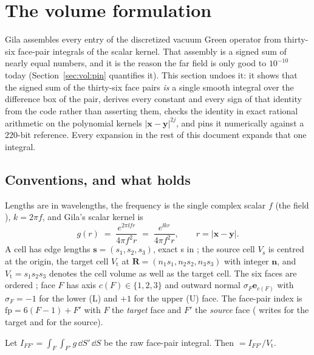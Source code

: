 \section{The volume formulation}
\label{sec:vol}

Gila assembles every entry of the discretized vacuum Green operator from thirty-six
face-pair integrals of the scalar kernel. That assembly is a signed sum of nearly equal
numbers, and it is the reason the far field is only good to $10^{-10}$ today
(Section~\ref{sec:vol:pin} quantifies it). This section undoes it: it shows that the
signed sum of the thirty-six face pairs \emph{is} a single smooth integral over the
difference box of the pair, derives every constant and every sign of that identity from
the code rather than asserting them, checks the identity in exact rational arithmetic on
the polynomial kernels $|\mathbf{x}-\mathbf{y}|^{2j}$, and pins it numerically against a
$220$-bit reference. Every expansion in the rest of this document expands that one
integral.

\subsection{Conventions, and what  holds}
\label{sec:vol:conv}

Lengths are in wavelengths, the frequency is the single complex scalar $f$ (the field
), $k = 2\pi f$, and Gila's scalar kernel is
\begin{equation}
g(r) \;=\; \frac{e^{2\pi\ii f r}}{4\pi f^{2} r} \;=\; \frac{e^{\ii k r}}{4\pi f^{2} r},
\qquad r = |\mathbf{x}-\mathbf{y}| .
\label{eq:vol:ker}
\end{equation}
A cell has edge lengths $\mathbf{s} = (s_1,s_2,s_3)$, exact s in
; the source cell $V_{\mathrm{s}}$ is centred at the origin, the target
cell $V_{\mathrm{t}}$ at $\mathbf{R} = (n_1 s_1, n_2 s_2, n_3 s_3)$ with integer
$\mathbf{n}$, and $V_{\mathrm{t}} = s_1 s_2 s_3$ denotes the cell volume as well as the
target cell. The six faces are ordered ; face $F$ has axis
$c(F) \in \{1,2,3\}$ and outward normal $\sigma_F \mathbf{e}_{c(F)}$ with
$\sigma_F = -1$ for the lower (L) and $+1$ for the upper (U) face. The face-pair index is
$\mathrm{fp} = 6(F-1) + F'$ with $F$ the \emph{target} face and $F'$ the \emph{source}
face ( writes  for the target and
 for the source).

\begin{lemma}
\label{lem:vol:scl}
Let $I_{FF'} = \int_F\int_{F'} g\,\dd S'\,\dd S$ be the raw face-pair integral. Then
 $= I_{FF'}/V_{\mathrm{t}}$.
\end{lemma}

